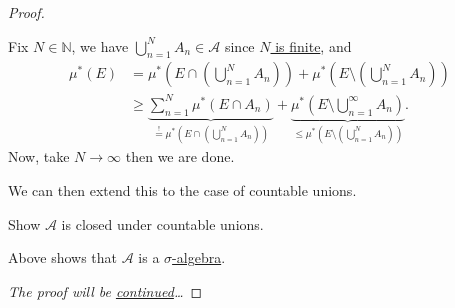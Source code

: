 \begin{proof}
\begin{enumerate}[(1)]
\begin{itemize}
\begin{explanation}
				            Fix \(N\in\mathbb{N} \), we have \(\bigcup\limits_{n=1}^{N} A_{n}\in \mathcal{A} \) since \hyperref[pf:Caratheodory-extension-Thm-1-finite-unions]{\(N\) is finite}, and
				            \[
					            \begin{split}
						            \mu^{\ast} (E) &= \mu^{\ast} \left(E\cap \left(\bigcup\limits_{n=1}^{N} A_{n}\right)\right) + \mu^{\ast} \left(E\setminus \left(\bigcup\limits_{n=1}^{N} A_{n}\right)\right)\\
						            &\geq \underbrace{\sum\limits_{n=1}^{N} \mu^{\ast} (E\cap A_{n})}_{ \overset{\hyperref[lma:disjoint-C-measurable-finite-additive]{!}}{=} \mu^{\ast} \left(E\cap \left(\bigcup\limits_{n=1}^{N} A_{n}\right)\right)} + \underbrace{\mu^{\ast} \left(E\setminus \bigcup\limits_{n=1}^{\infty} A_{n}\right)}_{\leq \mu^{\ast} \left(E\setminus \left(\bigcup\limits_{n=1}^{N} A_{n}\right)\right)}.
					            \end{split}
				            \]
				            Now, take \(N\to \infty \) then we are done.
			            \end{explanation}
			            We can then extend this to the case of countable unions.
			            \begin{exercise}
				            Show \(\mathcal{A} \) is closed under countable unions.
			            \end{exercise}
			            \begin{answer}
			            \end{answer}
		      \end{itemize}
		      Above shows that \(\mathcal{A} \) is a \hyperref[def:sigma-algebra]{\(\sigma\)-algebra}.
	\end{enumerate}
	\emph{The proof will be \hyperref[pf:Caratheodory-extension-Thm-cont]{continued}\dots}
\end{proof}